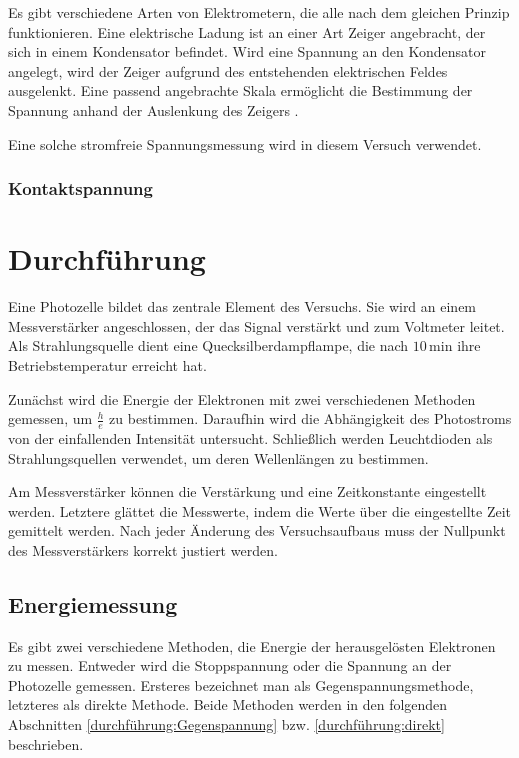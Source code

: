 \documentclass[12pt,a4paper]{scrartcl}
\numberwithin{equation}{section} %
\begin{document}
Es gibt verschiedene Arten von Elektrometern, die alle nach dem gleichen Prinzip funktionieren. Eine elektrische Ladung ist an einer Art Zeiger angebracht, der sich in einem Kondensator befindet. Wird eine Spannung an den Kondensator angelegt, wird der Zeiger aufgrund des entstehenden elektrischen Feldes ausgelenkt. Eine passend angebrachte Skala ermöglicht die Bestimmung der Spannung anhand der Auslenkung des Zeigers \cite{Gerthsen}.

Eine solche stromfreie Spannungsmessung wird in diesem Versuch verwendet.

\subsubsection{Kontaktspannung}

\clearpage
\hypertarget{durchfuxfchrung}{\section{Durchführung}\label{durchfuxfchrung}}
Eine Photozelle bildet das zentrale Element des Versuchs. Sie wird an einem Messverstärker angeschlossen, der das Signal verstärkt und zum Voltmeter leitet. Als Strahlungsquelle dient eine Quecksilberdampflampe, die nach $10\mathrm{\,min}$ ihre Betriebstemperatur erreicht hat.

Zunächst wird die Energie der Elektronen mit zwei verschiedenen Methoden gemessen, um $\frac{h}{e}$ zu bestimmen. Daraufhin wird die Abhängigkeit des Photostroms von der einfallenden Intensität untersucht. Schließlich werden Leuchtdioden als Strahlungsquellen verwendet, um deren Wellenlängen zu bestimmen.

Am Messverstärker können die Verstärkung und eine Zeitkonstante eingestellt werden. Letztere glättet die Messwerte, indem die Werte über die eingestellte Zeit gemittelt werden. Nach jeder Änderung des Versuchsaufbaus muss der Nullpunkt des Messverstärkers korrekt justiert werden.

\subsection{Energiemessung}
\label{durchführung:Energiemessung}
Es gibt zwei verschiedene Methoden, die Energie der herausgelösten Elektronen zu messen. Entweder wird die Stoppspannung oder die Spannung an der Photozelle gemessen. Ersteres bezeichnet man als Gegenspannungsmethode, letzteres als direkte Methode. Beide Methoden werden in den folgenden Abschnitten \ref{durchführung:Gegenspannung} bzw. \ref{durchführung:direkt} beschrieben.
\end{document}
